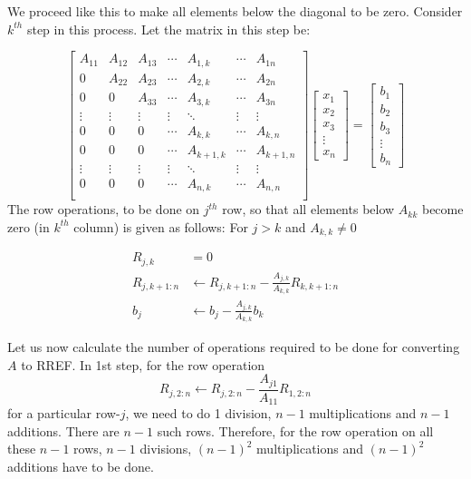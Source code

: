 \documentclass[
]{book}
\begin{document}
We proceed like this to make all elements below the diagonal to be zero. Consider \(k^{th}\) step in this process. Let the matrix in this step be:

\begin{equation}
\begin{bmatrix}
A_{11} & A_{12} & A_{13} & \cdots & A_{1,k} & \cdots & A_{1n}\\
0      & A_{22} & A_{23} & \cdots & A_{2,k} & \cdots & A_{2n}\\
0      & 0      & A_{33} & \cdots & A_{3,k} & \cdots & A_{3n}\\
\vdots & \vdots & \vdots & \vdots & \ddots  & \vdots & \vdots\\
0      & 0      & 0      & \cdots & A_{k,k} & \cdots & A_{k,n}\\
0      & 0      & 0      & \cdots & A_{k+1,k} & \cdots & A_{k+1,n}\\
\vdots & \vdots & \vdots & \vdots & \ddots  & \vdots & \vdots\\
0      & 0      & 0      & \cdots & A_{n,k} & \cdots & A_{n,n}\\
\end{bmatrix}
\begin{bmatrix} x_1 \\ x_2 \\x_3\\ \vdots\\ x_n\end{bmatrix}
=
\begin{bmatrix} b_1 \\ b_2 \\b_3\\ \vdots\\ b_n\end{bmatrix}
\end{equation}
The row operations, to be done on \(j^{th}\) row, so that all elements below \(A_{kk}\) become zero (in \(k^{th}\) column) is given as follows: For \(j>k\) and \(A_{k,k}\neq 0\)

\begin{align}
R_{j,k} &=0\\
R_{j,k+1:n} &\gets R_{j,k+1:n} - \frac{A_{j,k}}{A_{k,k}}R_{k,k+1:n} \\
b_j &\gets b_j - \frac{A_{j,k}}{A_{k,k}} b_k
\end{align}

Let us now calculate the number of operations required to be done for converting \(A\) to RREF. In 1st step, for the row operation \[R_{j,2:n} \gets R_{j,2:n} - \frac{A_{j1}}{A_{11}}R_{1,2:n}\] for a particular row-\(j\), we need to do 1 division, \(n-1\) multiplications and \(n-1\) additions. There are \(n-1\) such rows. Therefore, for the row operation on all these \(n-1\) rows, \(n-1\) divisions, \((n-1)^2\) multiplications and \((n-1)^2\) additions have to be done.
\end{document}

